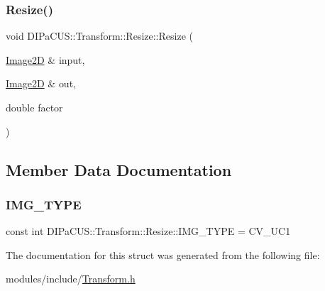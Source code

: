 \subsubsection{\texorpdfstring{Resize()}{Resize()}}
{\footnotesize\ttfamily void D\+I\+Pa\+C\+U\+S\+::\+Transform\+::\+Resize\+::\+Resize (\begin{DoxyParamCaption}\item[{\mbox{\hyperlink{structDIPaCUS_1_1Transform_1_1Resize_a0e4548850b3aed5dd86283f0c4f38fee}{Image2D}} \&}]{input,  }\item[{\mbox{\hyperlink{structDIPaCUS_1_1Transform_1_1Resize_a0e4548850b3aed5dd86283f0c4f38fee}{Image2D}} \&}]{out,  }\item[{double}]{factor }\end{DoxyParamCaption})\hspace{0.3cm}{\ttfamily [inline]}}



\subsection{Member Data Documentation}
\mbox{\label{structDIPaCUS_1_1Transform_1_1Resize_a94f6df88ddb94760235b92da8580b1d8}} 
\subsubsection{\texorpdfstring{I\+M\+G\+\_\+\+T\+Y\+PE}{IMG\_TYPE}}
{\footnotesize\ttfamily const int D\+I\+Pa\+C\+U\+S\+::\+Transform\+::\+Resize\+::\+I\+M\+G\+\_\+\+T\+Y\+PE = C\+V\+\_\+U\+C1}



The documentation for this struct was generated from the following file\+:\begin{DoxyCompactItemize}
\item 
modules/include/\mbox{\hyperlink{Transform_8h}{Transform.\+h}}\end{DoxyCompactItemize}
